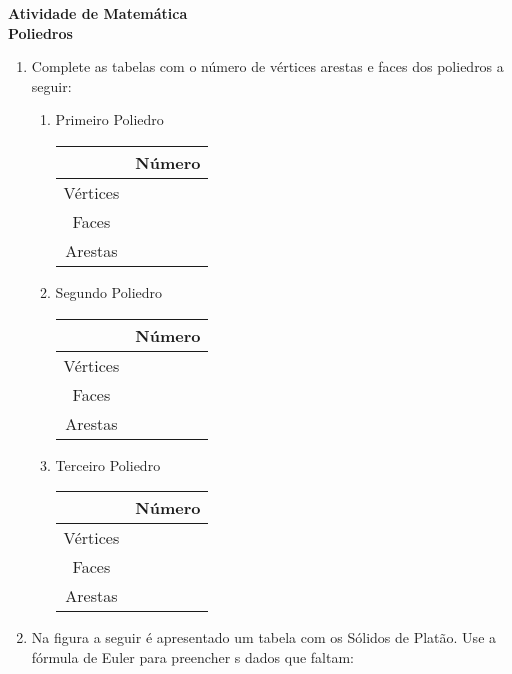 \documentclass[twocolumn,oneside,a4paper,12pt]{article}
\begin{document}
\pagestyle{empty}
\begin{center}
\textbf{Atividade de Matemática\\Poliedros}
\end{center}

\begin{enumerate}

\item Complete as tabelas com o número de vértices arestas e faces dos poliedros a seguir:
\begin{enumerate}
\item Primeiro Poliedro


{
\begin{tabular}{|c|c|}
\hline 
 & Número \\ 
\hline 
Vértices &  \\ 
\hline 
Faces &  \\ 
\hline 
Arestas &  \\ 
\hline 
\end{tabular} 
}

\item Segundo Poliedro


{
\begin{tabular}{|c|c|}
\hline 
 & Número \\ 
\hline 
Vértices &  \\ 
\hline 
Faces &  \\ 
\hline 
Arestas &  \\ 
\hline 
\end{tabular} 
}

\item Terceiro Poliedro


{
\begin{tabular}{|c|c|}
\hline 
 & Número \\ 
\hline 
Vértices &  \\ 
\hline 
Faces &  \\ 
\hline 
Arestas &  \\ 
\hline 
\end{tabular} 
}
\end{enumerate}

\item Na figura a seguir é apresentado um tabela com os Sólidos de Platão. Use a fórmula de Euler para preencher s dados que faltam:



\end{enumerate}
\end{document}
